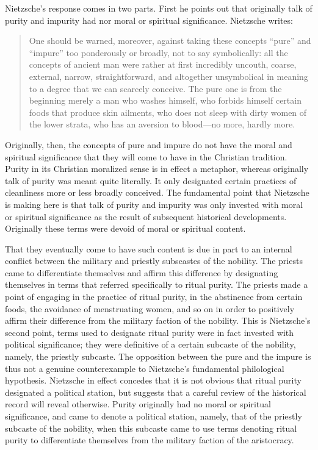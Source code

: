 Nietzsche's response comes in two parts. First he points out that originally talk of purity and impurity had nor moral or spiritual significance. Nietzsche writes:
\begin{quote}
    One should be warned, moreover, against taking these concepts ``pure'' and ``impure'' too ponderously or broadly, not to say symbolically: all the concepts of ancient man were rather at first incredibly uncouth, coarse, external, narrow, straightforward, and altogether unsymbolical in meaning to a degree that we can scarcely conceive. The pure one is from the beginning merely a man who washes himself, who forbids himself certain foods that produce skin ailments, who does not sleep with dirty women of the lower strata, who has an aversion to blood---no more, hardly more.
\end{quote}

Originally, then, the concepts of pure and impure do not have the moral and spiritual significance that they will come to have in the Christian tradition. Purity in its Christian moralized sense is in effect a metaphor, whereas originally talk of purity was meant quite literally. It only designated certain practices of cleanliness more or less broadly conceived. The fundamental point that Nietzsche is making here is that talk of purity and impurity was only invested with moral or spiritual significance as the result of subsequent historical developments. Originally these terms were devoid of moral or spiritual content.

That they eventually come to have such content is due in part to an internal conflict between the military and priestly subscastes of the nobility. The priests came to differentiate themselves and affirm this difference by designating themselves in terms that referred specifically to ritual purity. The priests made a point of engaging in the practice of ritual purity, in the abstinence from certain foods, the avoidance of menstruating women, and so on in order to positively affirm their difference from the military faction of the nobility. This is Nietzsche's second point, terms used to designate ritual purity were in fact invested with political significance; they were definitive of a certain subcaste of the nobility, namely, the priestly subcaste. The opposition between the pure and the impure is thus not a genuine counterexample to Nietzsche's fundamental philological hypothesis. Nietzsche in effect concedes that it is not obvious that ritual purity designated a political station, but suggests that a careful review of the historical record will reveal otherwise. Purity originally had no moral or spiritual significance, and came to denote a political station, namely, that of the priestly subcaste of the nobility, when this subcaste came to use terms denoting ritual purity to differentiate themselves from the military faction of the aristocracy.

